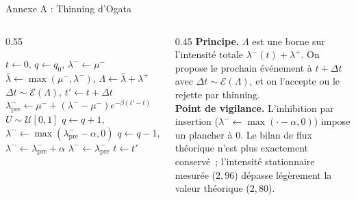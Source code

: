 \documentclass[10pt,aspectratio=169]{beamer}
\begin{document}
\begin{frame}{Annexe A : Thinning d'Ogata}
\begin{columns}[T]
\begin{column}{0.55\textwidth}
\small
\begin{algorithmic}[1]
\State $t\gets0$,\; $q\gets q_0$,\; $\lambda^-\gets\mu^-$
  \State $\bar\lambda\gets\max(\mu^-,\lambda^-)$,\;
         $\Lambda\gets\bar\lambda+\lambda^+$
  \State $\Delta t\sim\mathcal{E}(\Lambda)$,\; $t'\gets t+\Delta t$
  \State $\lambda^-_\mathrm{pre}\gets\mu^-+(\lambda^--\mu^-)e^{-\beta(t'-t)}$
  \State $U\sim\mathcal{U}[0,1]$
    \State $q\gets q+1$,\;
           $\lambda^-\gets\max(\lambda^-_\mathrm{pre}-\alpha,0)$
    \State $q\gets q-1$,\;
           $\lambda^-\gets\lambda^-_\mathrm{pre}+\alpha$
  \Else\; $\lambda^-\gets\lambda^-_\mathrm{pre}$
  \EndIf
  \State $t\gets t'$
\EndWhile
\end{algorithmic}
\end{column}
\begin{column}{0.45\textwidth}
\small
\textbf{Principe.} $\Lambda$ est une borne sur l'intensité totale $\lambda^-(t)+\lambda^+$. On propose le prochain événement à $t+\Delta t$ avec $\Delta t\sim\mathcal{E}(\Lambda)$, et on l'accepte ou le rejette par thinning.\\[1ex]

\textbf{Point de vigilance.} L'inhibition par insertion ($\lambda^-\gets\max(\cdot-\alpha,0)$) impose un plancher à 0. Le bilan de flux théorique n'est plus exactement conservé~; l'intensité stationnaire mesurée ($2{,}96$) dépasse légèrement la valeur théorique ($2{,}80$).
\end{column}
\end{columns}
\end{frame}
\end{document}
